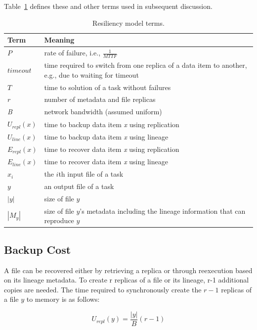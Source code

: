 \documentclass{sig-alternate}
\begin{document}
Table~\ref{tab:modelterms} defines these and other terms used in subsequent discussion. 

\begin{table}
\centering
\caption{Resiliency model terms.}
\label{tab:modelterms}
\begin{tabular}{|p{1cm}|p{6.25cm}|} \hline
Term & Meaning \\ \hline
{$P$} 					& rate of failure, i.e., $\frac{1}{MTTF}$ \\
{$timeout$} 					& time required to switch from one replica of a data item to another, e.g., due to waiting for timeout \\
{$T$}					& time to solution of a task without failures\\
{$r$} 					& number of metadata and file replicas \\
{\em B} 				& network bandwidth (assumed uniform) \\
{$U_{repl}(x)$} &  time to backup data item {\em x} using replication \\
{$U_{line}(x)$} &  time to backup data item {\em x} using lineage \\
{$E_{repl}(x)$} &   time to recover data item {\em x} using replication \\
{$E_{line}(x)$} &   time to recover data item {\em x} using lineage \\
{$x_i$} 				& the $i$th input file of a task \\
{$y$}				& an output file of a task \\
{$|y|$}				& size of file $y$ \\
{$|M_{y}|$}		& size of file $y$'s metadata including the lineage information that can reproduce $y$\\
\hline\end{tabular}
\end{table}


\subsection{Backup Cost}
A file can be recovered either by retrieving a replica or through reexecution based on its lineage metadata.  To create r replicas of a file or its lineage, r-1 additional copies are needed.  The time required to synchronously create the $r-1$ replicas of a file $y$ to memory is as follows:

\begin{equation}
U_{repl}(y) = \frac{|y|}{B} (r-1)
\end{equation}
\end{document}
